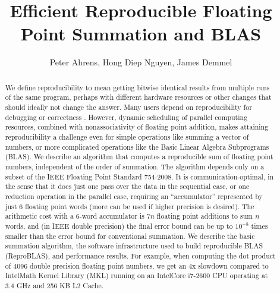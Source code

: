 \documentclass[12pt]{article}
\author{Peter Ahrens, Hong Diep Nguyen, James Demmel}
\title{Efficient Reproducible Floating Point Summation and BLAS}
\theoremstyle{definition}
\numberwithin{equation}{section}
\numberwithin{figure}{section}
\begin{document}
\noindent
\maketitle
\begin{abstract}
We define reproducibility to mean getting bitwise identical results from
multiple runs of the same program, perhaps with different hardware resources or other
changes that should ideally not change the answer. Many users depend on reproducibility
for debugging or correctness \cite{reproducibilityBOF}. However, dynamic scheduling of parallel computing
resources, combined with nonassociativity of floating point addition, makes attaining
reproducibility a challenge even for simple operations like summing a vector of numbers,
or more complicated operations like the Basic Linear Algebra Subprograms (BLAS).
We describe an algorithm that computes a reproducible sum of floating point numbers,
independent of the order of summation. The algorithm depends only on a subset of
the IEEE Floating Point Standard 754-2008. It is communication-optimal, in the sense that
it does just one pass over the data in the sequential case, or one reduction operation in
the parallel case, requiring an ``accumulator'' represented by just 6 floating point words
(more can be used if higher precision is desired). The arithmetic cost with a 6-word
accumulator is $7n$ floating point additions to sum $n$ words, and (in IEEE double precision) the
final error bound can be up to $10^{-8}$ times smaller than the error bound for conventional
summation. We describe the basic summation algorithm, the software infrastructure used to
build reproducible BLAS (ReproBLAS), and performance results. For example, when computing the dot product of 4096 double precision floating point numbers, we get an
4x slowdown compared to Intel\textregistered Math Kernel Library (MKL) running on an Intel\textregistered Core i7-2600 CPU operating at 3.4 GHz and 256 KB L2 Cache.
\end{abstract}
\newpage
\tableofcontents
\newpage












\end{document}
